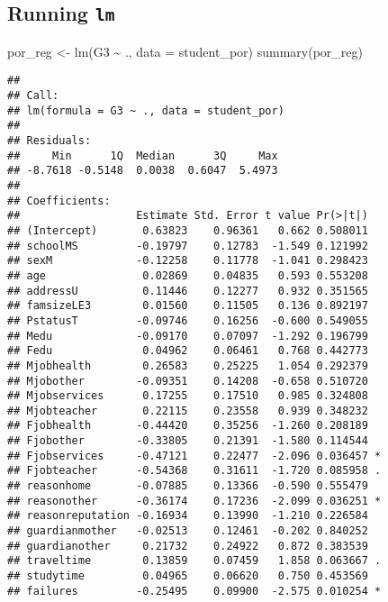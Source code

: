 \documentclass[
]{article}
\newenvironment{Shaded}{\begin{snugshade}}{\end{snugshade}}
\newcommand{\AttributeTok}[1]{\textcolor[rgb]{0.77,0.63,0.00}{#1}}
\newcommand{\FunctionTok}[1]{\textcolor[rgb]{0.00,0.00,0.00}{#1}}
\newcommand{\NormalTok}[1]{#1}
\newcommand{\OtherTok}[1]{\textcolor[rgb]{0.56,0.35,0.01}{#1}}
\newcommand{\SpecialCharTok}[1]{\textcolor[rgb]{0.00,0.00,0.00}{#1}}
\begin{document}
\hypertarget{running-lm}{%
\subsection{\texorpdfstring{Running
\texttt{lm}}{Running lm}}\label{running-lm}}

\begin{Shaded}
\begin{Highlighting}[]
\NormalTok{por\_reg }\OtherTok{\textless{}{-}} \FunctionTok{lm}\NormalTok{(G3 }\SpecialCharTok{\textasciitilde{}}\NormalTok{ ., }\AttributeTok{data =}\NormalTok{ student\_por)}
\FunctionTok{summary}\NormalTok{(por\_reg)}
\end{Highlighting}
\end{Shaded}

\begin{verbatim}
## 
## Call:
## lm(formula = G3 ~ ., data = student_por)
## 
## Residuals:
##     Min      1Q  Median      3Q     Max 
## -8.7618 -0.5148  0.0038  0.6047  5.4973 
## 
## Coefficients:
##                  Estimate Std. Error t value Pr(>|t|)    
## (Intercept)       0.63823    0.96361   0.662 0.508011    
## schoolMS         -0.19797    0.12783  -1.549 0.121992    
## sexM             -0.12258    0.11778  -1.041 0.298423    
## age               0.02869    0.04835   0.593 0.553208    
## addressU          0.11446    0.12277   0.932 0.351565    
## famsizeLE3        0.01560    0.11505   0.136 0.892197    
## PstatusT         -0.09746    0.16256  -0.600 0.549055    
## Medu             -0.09170    0.07097  -1.292 0.196799    
## Fedu              0.04962    0.06461   0.768 0.442773    
## Mjobhealth        0.26583    0.25225   1.054 0.292379    
## Mjobother        -0.09351    0.14208  -0.658 0.510720    
## Mjobservices      0.17255    0.17510   0.985 0.324808    
## Mjobteacher       0.22115    0.23558   0.939 0.348232    
## Fjobhealth       -0.44420    0.35256  -1.260 0.208189    
## Fjobother        -0.33805    0.21391  -1.580 0.114544    
## Fjobservices     -0.47121    0.22477  -2.096 0.036457 *  
## Fjobteacher      -0.54368    0.31611  -1.720 0.085958 .  
## reasonhome       -0.07885    0.13366  -0.590 0.555479    
## reasonother      -0.36174    0.17236  -2.099 0.036251 *  
## reasonreputation -0.16934    0.13990  -1.210 0.226584    
## guardianmother   -0.02513    0.12461  -0.202 0.840252    
## guardianother     0.21732    0.24922   0.872 0.383539    
## traveltime        0.13859    0.07459   1.858 0.063667 .  
## studytime         0.04965    0.06620   0.750 0.453569    
## failures         -0.25495    0.09900  -2.575 0.010254 *  

\end{verbatim}
\end{document}
